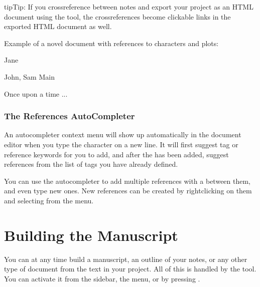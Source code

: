 \documentclass[a4paper,11pt,english]{sphinxmanual}
\begin{document}
\begin{sphinxadmonition}{tip}{Tip:}
\sphinxAtStartPar
If you cross\sphinxhyphen{}reference between notes and export your project as an HTML document using the
 tool, the cross\sphinxhyphen{}references become clickable links in the exported HTML
document as well.
\end{sphinxadmonition}

\sphinxAtStartPar
Example of a novel document with references to characters and plots:

\begin{sphinxVerbatim}[commandchars=\\\{\}]

 Jane


 John, Sam
 Main

Once upon a time ...
\end{sphinxVerbatim}


\subsection{The References Auto\sphinxhyphen{}Completer}
\label{\detokenize{project_references:the-references-auto-completer}}\label{\detokenize{project_references:a-references-completer}}
\sphinxAtStartPar
An auto\sphinxhyphen{}completer context menu will show up automatically in the document editor when you type the
character  on a new line. It will first suggest tag or reference keywords for you to add, and
after the \sphinxcode{\sphinxupquote{:}} has been added, suggest references from the list of tags you have already defined.

\sphinxAtStartPar
You can use the auto\sphinxhyphen{}completer to add multiple references with a \sphinxcode{\sphinxupquote{,}} between them, and even type
new ones. New references can be created by right\sphinxhyphen{}clicking on them and selecting  from the menu.

\sphinxAtStartPar
{}

\sphinxstepscope


\chapter{Building the Manuscript}
\label{\detokenize{project_manuscript:building-the-manuscript}}\label{\detokenize{project_manuscript:a-manuscript}}\label{\detokenize{project_manuscript::doc}}
\sphinxAtStartPar
You can at any time build a manuscript, an outline of your notes, or any other type of document
from the text in your project. All of this is handled by the  tool. You can
activate it from the sidebar, the  menu, or by pressing .
\end{document}
